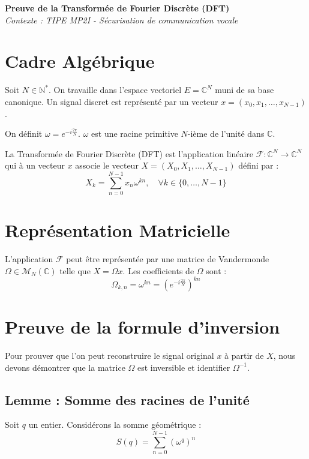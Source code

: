 \documentclass[11pt,a4paper]{article}
\begin{document}
\begin{center}
    {\huge \textbf{Preuve de la Transformée de Fourier Discrète (DFT)}} \\
    \vspace{0.5cm}
    {\large \textit{Contexte : TIPE MP2I - Sécurisation de communication vocale}} \\
    \vspace{1cm}
\end{center}

\section{Cadre Algébrique}
Soit $N \in \mathbb{N}^*$. On travaille dans l'espace vectoriel $E = \mathbb{C}^N$ muni de sa base canonique. Un signal discret est représenté par un vecteur $x = (x_0, x_1, \dots, x_{N-1})$.

On définit $\omega = e^{-i\frac{2\pi}{N}}$. $\omega$ est une racine primitive $N$-ième de l'unité dans $\mathbb{C}$.

La Transformée de Fourier Discrète (DFT) est l'application linéaire $\mathcal{F} : \mathbb{C}^N \to \mathbb{C}^N$ qui à un vecteur $x$ associe le vecteur $X = (X_0, X_1, \dots, X_{N-1})$ défini par :
\begin{equation}
X_k = \sum_{n=0}^{N-1} x_n \omega^{kn}, \quad \forall k \in \{0, \dots, N-1\}
\end{equation}

\section{Représentation Matricielle}
L'application $\mathcal{F}$ peut être représentée par une matrice de Vandermonde $\Omega \in \mathcal{M}_N(\mathbb{C})$ telle que $X = \Omega x$. Les coefficients de $\Omega$ sont :
\[ \Omega_{k,n} = \omega^{kn} = (e^{-i\frac{2\pi}{N}})^{kn} \]

\section{Preuve de la formule d'inversion}

Pour prouver que l'on peut reconstruire le signal original $x$ à partir de $X$, nous devons démontrer que la matrice $\Omega$ est inversible et identifier $\Omega^{-1}$.

\subsection{Lemme : Somme des racines de l'unité}
Soit $q$ un entier. Considérons la somme géométrique :
\[ S(q) = \sum_{n=0}^{N-1} (\omega^q)^n \]
\end{document}
